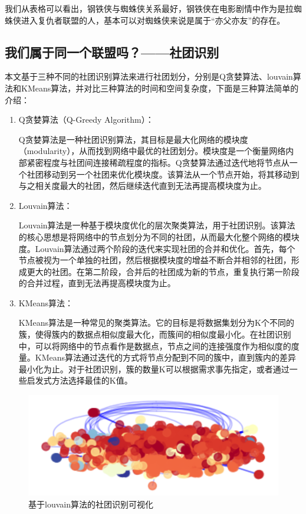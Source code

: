 \documentclass[12pt]{xjtureport}
\begin{document}
我们从表格可以看出，钢铁侠与蜘蛛侠关系最好，钢铁侠在电影剧情中作为是拉蜘蛛侠进入复仇者联盟的人，基本可以对蜘蛛侠来说是属于“亦父亦友”的存在。

\subsection{我们属于同一个联盟吗？——社团识别}

本文基于三种不同的社团识别算法来进行社团划分，分别是Q贪婪算法、louvain算法和KMeans算法，并对比三种算法的时间和空间复杂度，下面是三种算法简单的介绍：

\begin{enumerate}
    \item Q贪婪算法（Q-Greedy Algorithm）：
    
    Q贪婪算法是一种社团识别算法，其目标是最大化网络的模块度（modularity），从而找到网络中最优的社团划分。模块度是一个衡量网络内部紧密程度与社团间连接稀疏程度的指标。Q贪婪算法通过迭代地将节点从一个社团移动到另一个社团来优化模块度。该算法从一个节点开始，将其移动到与之相关度最大的社团，然后继续迭代直到无法再提高模块度为止。

    \item Louvain算法：
    
    Louvain算法是一种基于模块度优化的层次聚类算法，用于社团识别。该算法的核心思想是将网络中的节点划分为不同的社团，从而最大化整个网络的模块度。Louvain算法通过两个阶段的迭代来实现社团的合并和优化。首先，每个节点被视为一个单独的社团，然后根据模块度的增益不断合并相邻的社团，形成更大的社团。在第二阶段，合并后的社团成为新的节点，重复执行第一阶段的合并过程，直到无法再提高模块度为止。

    
    \item KMeans算法：
    
    KMeans算法是一种常见的聚类算法。它的目标是将数据集划分为K个不同的簇，使得簇内的数据点相似度最大化，而簇间的相似度最小化。在社团识别中，可以将网络中的节点看作是数据点，节点之间的连接强度作为相似度的度量。KMeans算法通过迭代的方式将节点分配到不同的簇中，直到簇内的差异最小化为止。对于社团识别，簇的数量K可以根据需求事先指定，或者通过一些启发式方法选择最佳的K值。

\end{enumerate}

\begin{figure}[!htbp]
    \centering
    \includegraphics[width=0.5\linewidth]{figures/bcsj_louvain_visualize_part.png}
    \caption{基于louvain算法的社团识别可视化}
    \label{community}
\end{figure}
\end{document}
